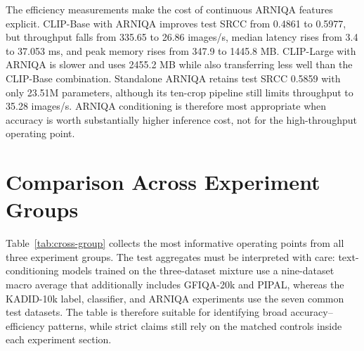 \documentclass{article}
\begin{document}
The efficiency measurements make the cost of continuous ARNIQA features explicit. CLIP-Base with ARNIQA improves test SRCC from 0.4861 to 0.5977, but throughput falls from 335.65 to 26.86 images/s, median latency rises from 3.4 to 37.053 ms, and peak memory rises from 347.9 to 1445.8 MB. CLIP-Large with ARNIQA is slower and uses 2455.2 MB while also transferring less well than the CLIP-Base combination. Standalone ARNIQA retains test SRCC 0.5859 with only 23.51M parameters, although its ten-crop pipeline still limits throughput to 35.28 images/s. ARNIQA conditioning is therefore most appropriate when accuracy is worth substantially higher inference cost, not for the high-throughput operating point.

\section{Comparison Across Experiment Groups}

Table~\ref{tab:cross-group} collects the most informative operating points from all three experiment groups. The test aggregates must be interpreted with care: text-conditioning models trained on the three-dataset mixture use a nine-dataset macro average that additionally includes GFIQA-20k and PIPAL, whereas the KADID-10k label, classifier, and ARNIQA experiments use the seven common test datasets. The table is therefore suitable for identifying broad accuracy--efficiency patterns, while strict claims still rely on the matched controls inside each experiment section.

\begin{table}[htbp]
\centering
\small
\setlength{\tabcolsep}{3pt}
\caption{Representative results across experiment groups. Bold marks the highest reported test SRCC among the selected CLIP-Base configurations, not a strict common-suite ranking.}
\label{tab:cross-group}
\end{table}
\end{document}

